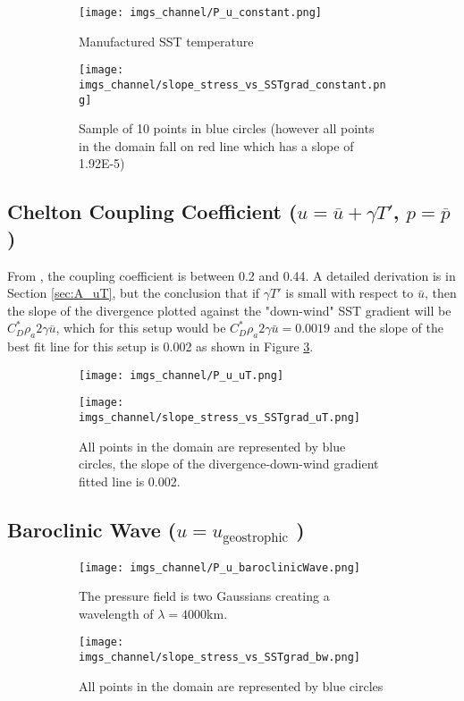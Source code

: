 \documentclass[12pt,a4paper]{article}
\begin{document}
\begin{figure}[h!]
\centering
\begin{subfigure}[t]{0.6\textwidth}
\texttt{[image: imgs\_channel/P\_u\_constant.png]}
\caption{Manufactured SST temperature}
\end{subfigure}
\begin{subfigure}[t]{\textwidth}
\texttt{[image: imgs\_channel/slope\_stress\_vs\_SSTgrad\_constant.png]}
\caption{Sample of 10 points in blue circles (however all points in the domain fall on red line which has a slope of 1.92E-5)}
\end{subfigure}
\caption{\label{Fig:constant}}
\end{figure}

\subsection{Chelton Coupling Coefficient ($u = \overline{u} + \gamma T'$, $p = \overline{p}$)}
From \citep{Chelton2004}, the coupling coefficient is between 0.2 and 0.44. A detailed derivation is in Section \ref{sec:A_uT}, but the conclusion that if $\gamma T'$ is small with respect to $\bar{u}$, then the slope of the divergence plotted against the "down-wind" SST gradient will be $C_D^*\rho_a 2\gamma\bar{u}$, which for this setup would be $C_D^*\rho_a 2\gamma\bar{u} = 0.0019$ and the slope of the best fit line for this setup is 0.002 as shown in Figure \ref{Fig:uT}. \\

\begin{figure}[h!]
\centering
\begin{subfigure}[t]{0.6\textwidth}
\texttt{[image: imgs\_channel/P\_u\_uT.png]}
\end{subfigure}
\begin{subfigure}[t]{\textwidth}
\texttt{[image: imgs\_channel/slope\_stress\_vs\_SSTgrad\_uT.png]}
\caption{All points in the domain are represented by blue circles, the slope of the divergence-down-wind gradient fitted line is 0.002.}
\end{subfigure}
\caption{\label{Fig:uT}}
\end{figure}

\subsection{Baroclinic Wave ($u = u_{\text{geostrophic}}$ )}


\begin{figure}[h!]
\centering
\begin{subfigure}[t]{0.6\textwidth}
\texttt{[image: imgs\_channel/P\_u\_baroclinicWave.png]}
\caption{The pressure field is two Gaussians creating a wavelength of $\lambda = 4000$km.}
\end{subfigure}
\begin{subfigure}[t]{\textwidth}
\texttt{[image: imgs\_channel/slope\_stress\_vs\_SSTgrad\_bw.png]}
\caption{All points in the domain are represented by blue circles}
\end{subfigure}
\caption{\label{Fig:uT}}
\end{figure}
\end{document}
